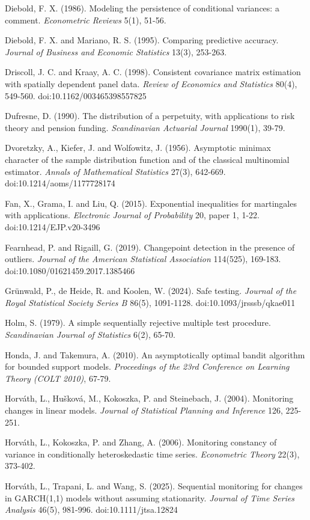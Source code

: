 \documentclass[
]{article}
\begin{document}
Diebold, F. X. (1986). Modeling the persistence of conditional
variances: a comment. \emph{Econometric Reviews} 5(1), 51-56.

Diebold, F. X. and Mariano, R. S. (1995). Comparing predictive accuracy.
\emph{Journal of Business and Economic Statistics} 13(3), 253-263.

Driscoll, J. C. and Kraay, A. C. (1998). Consistent covariance matrix
estimation with spatially dependent panel data. \emph{Review of
Economics and Statistics} 80(4), 549-560. doi:10.1162/003465398557825

Dufresne, D. (1990). The distribution of a perpetuity, with applications
to risk theory and pension funding. \emph{Scandinavian Actuarial
Journal} 1990(1), 39-79.

Dvoretzky, A., Kiefer, J. and Wolfowitz, J. (1956). Asymptotic minimax
character of the sample distribution function and of the classical
multinomial estimator. \emph{Annals of Mathematical Statistics} 27(3),
642-669. doi:10.1214/aoms/1177728174

Fan, X., Grama, I. and Liu, Q. (2015). Exponential inequalities for
martingales with applications. \emph{Electronic Journal of Probability}
20, paper 1, 1-22. doi:10.1214/EJP.v20-3496

Fearnhead, P. and Rigaill, G. (2019). Changepoint detection in the
presence of outliers. \emph{Journal of the American Statistical
Association} 114(525), 169-183. doi:10.1080/01621459.2017.1385466

Grünwald, P., de Heide, R. and Koolen, W. (2024). Safe testing.
\emph{Journal of the Royal Statistical Society Series B} 86(5),
1091-1128. doi:10.1093/jrsssb/qkae011

Holm, S. (1979). A simple sequentially rejective multiple test
procedure. \emph{Scandinavian Journal of Statistics} 6(2), 65-70.

Honda, J. and Takemura, A. (2010). An asymptotically optimal bandit
algorithm for bounded support models. \emph{Proceedings of the 23rd
Conference on Learning Theory (COLT 2010)}, 67-79.

Horváth, L., Hušková, M., Kokoszka, P. and Steinebach, J. (2004).
Monitoring changes in linear models. \emph{Journal of Statistical
Planning and Inference} 126, 225-251.

Horváth, L., Kokoszka, P. and Zhang, A. (2006). Monitoring constancy of
variance in conditionally heteroskedastic time series. \emph{Econometric
Theory} 22(3), 373-402.

Horváth, L., Trapani, L. and Wang, S. (2025). Sequential monitoring for
changes in GARCH(1,1) models without assuming stationarity.
\emph{Journal of Time Series Analysis} 46(5), 981-996.
doi:10.1111/jtsa.12824
\end{document}
